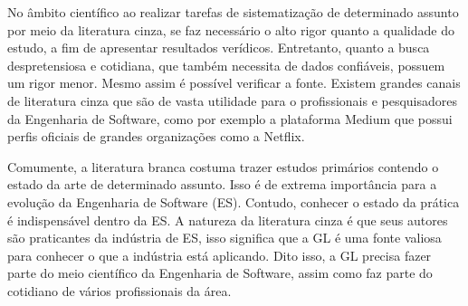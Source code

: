 \documentclass[12pt]{article}
\begin{document}
No âmbito científico ao realizar tarefas de sistematização de determinado assunto por meio da literatura cinza, se faz necessário o alto rigor quanto a qualidade do estudo, a fim de apresentar resultados verídicos. Entretanto, quanto a busca despretensiosa e cotidiana, que também necessita de dados confiáveis, possuem um rigor menor. Mesmo assim é possível verificar a fonte. Existem grandes canais de literatura cinza que são de vasta utilidade para o profissionais e pesquisadores da Engenharia de Software, como por exemplo a plataforma Medium que possui perfis oficiais de grandes organizações como a Netflix.

Comumente, a literatura branca costuma trazer estudos primários contendo o estado da arte de determinado assunto. Isso é de extrema importância para a evolução da Engenharia de Software (ES). Contudo, conhecer o estado da prática é indispensável dentro da ES. A natureza da literatura cinza é que seus autores são praticantes da indústria de ES, isso significa que a GL é uma fonte valiosa para conhecer o que a indústria está aplicando. Dito isso, a GL precisa fazer parte do meio científico da Engenharia de Software, assim como faz parte do cotidiano de vários profissionais da área.











\end{document}
